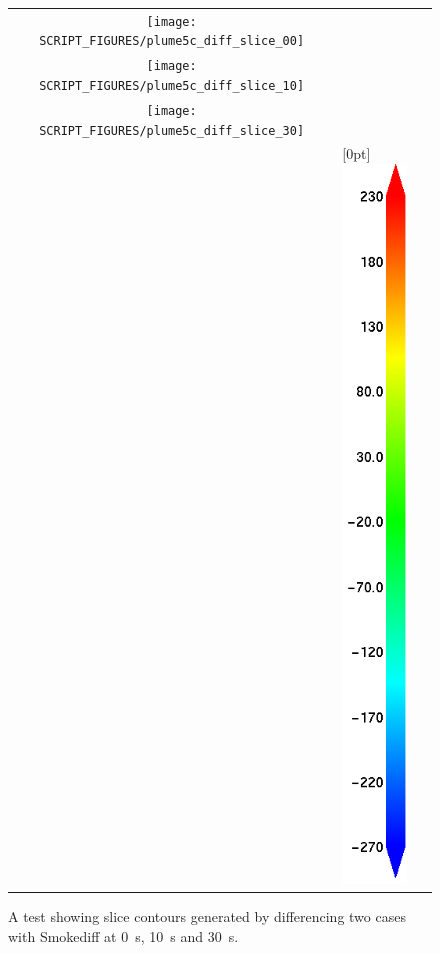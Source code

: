 \documentclass[11pt,twoside]{book}
\begin{document}
\begin{figure}[bph]
\begin{center}
\begin{tabular}{cp{1.0in}}
 \texttt{[image: SCRIPT\_FIGURES/plume5c\_diff\_slice\_00]}\\
 \texttt{[image: SCRIPT\_FIGURES/plume5c\_diff\_slice\_10]}\\
 \texttt{[image: SCRIPT\_FIGURES/plume5c\_diff\_slice\_30]}\\
&\raisebox{0.5in}[0pt]{\includegraphics[height=7.5in]{FIGURES/colorbar_tempdiff}}\\
 \end{tabular}
\end{center}
 \caption[A test showing slice contours generated by differencing two cases with
 Smokediff]{A test showing slice contours generated by differencing
 two cases with Smokediff  at \SI{0}{s}, \SI{10}{s} and \SI{30}{s}.}
\label{figdiffslicetest}%
\end{figure}
\end{document}
